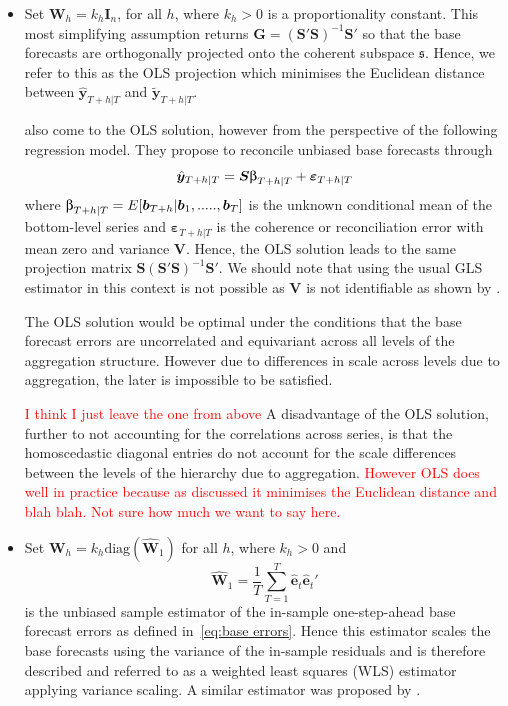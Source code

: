 \documentclass[graybox]{svmult}
\begin{document}
\begin{itemize}
    \item Set ${\bm{W}}_{h}=k_h\bm{I}_n$, for all $h$, where $k_{h} > 0$ is a proportionality constant. This most simplifying assumption returns $\bm{G}=(\bm{S}'\bm{S})^{-1}\bm{S}'$ so that the base forecasts are orthogonally projected onto the coherent subspace $\mathfrak{s}$. Hence, we refer to this as the OLS projection which minimises the Euclidean distance between $\hat{\bm{y}}_{T+h|T}$ and $\tilde{\bm{y}}_{T+h|T}$.

        \cite{HynEtAl2011} also come to the OLS solution, however from the perspective of the following regression model. They propose to reconcile unbiased base forecasts through \begin{equation*}\hat{\bm{y}}_{T+h|T} = \bm{S\ubeta}_{T+h|T} + \bm{\varepsilon}_{T+h|T} \end{equation*} where $\bm{\ubeta}_{T+h|T}=E[\bm{b}_{T+h}|\bm{b}_1,.....,\bm{b}_T]$ is the unknown conditional mean of the bottom-level series and $\bm{\varepsilon}_{T+h|T}$ is the coherence or reconciliation error with mean zero and variance $\bm{V}$. Hence, the OLS solution leads to the same projection matrix $\bm{S}(\bm{S}'\bm{S})^{-1}\bm{S}'$. We should note that using the usual GLS estimator in this context is not possible as $\bm{V}$ is not identifiable as shown by \cite{WicEtAl2019}.
        
        The OLS solution would be optimal under the conditions that the base forecast errors are uncorrelated and equivariant across all levels of the aggregation structure. However due to differences in scale across levels due to aggregation, the later is impossible to be satisfied.
        
        \textcolor{red}{I think I just leave the one from above} A disadvantage of the OLS solution, further to not accounting for the correlations across series, is that the homoscedastic diagonal entries do not account for the scale differences between the levels of the hierarchy due to aggregation. \textcolor{red}{However OLS does well in practice because as discussed it minimises the Euclidean distance and blah blah. Not sure how much we want to say here.}

    \item Set ${\bm{W}}_{h}=k_{h}\text{diag}(\hat{\bm{W}}_{1})$ for all $h$, where $k_{h} > 0$ and
        $$
        \hat{\bm{W}}_{1} = \frac{1}{T}\sum_{T=1}^{T} \hat{\bm{e}}_{t}\hat{\bm{e}}_{t}'
        $$
        is the unbiased sample estimator of the in-sample one-step-ahead base forecast errors as defined in~\eqref{eq:base errors}. Hence this estimator scales the base forecasts using the variance of the in-sample residuals and is therefore described and referred to as a weighted least squares (WLS) estimator applying variance scaling. A similar estimator was proposed by \cite{Hyndman2016}.
        

\end{itemize}
\end{document}
